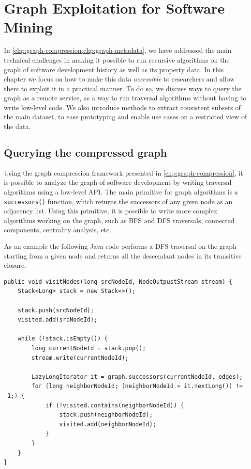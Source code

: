 \chapter{Graph Exploitation for Software Mining}%
\label{chp:graph-exploitation}

In \cref{chp:graph-compression,chp:graph-metadata}, we have addressed the main
technical challenges in making it possible to run recursive algorithms on the
graph of software development history as well as its property data. In this
chapter we focus on how to make this data \emph{accessible} to researchers and
allow them to exploit it in a practical manner. To do so, we discuss ways to
query the graph as a remote service, as a way to run traversal algorithms
without having to write low-level code. We also introduce methods to extract
consistent subsets of the main dataset, to ease prototyping and enable use
cases on a restricted view of the data.

\section{Querying the compressed graph}
\label{sec:graph-querying}

Using the graph compression framework presented in
\cref{chp:graph-compression}, it is possible to analyze the graph of software
development by writing traversal algorithms using a low-level API\@. The main
primitive for graph algorithms is a \texttt{successors()} function, which
returns the successors of any given node as an adjacency list. Using this
primitive, it is possible to write more complex algorithms working on the
graph, such as \gls{BFS} and \gls{DFS} traversals, connected components,
centrality analysis, etc.

As an example the following Java code performs a \gls{DFS} traversal on the
graph starting from a given node and returns all the descendant nodes in its
transitive closure.

\begin{verbatim}
public void visitNodes(long srcNodeId, NodeOutpustStream stream) {
    Stack<Long> stack = new Stack<>();

    stack.push(srcNodeId);
    visited.add(srcNodeId);

    while (!stack.isEmpty()) {
        long currentNodeId = stack.pop();
        stream.write(currentNodeId);

        LazyLongIterator it = graph.successors(currentNodeId, edges);
        for (long neighborNodeId; (neighborNodeId = it.nextLong()) != -1;) {
            if (!visited.contains(neighborNodeId)) {
                stack.push(neighborNodeId);
                visited.add(neighborNodeId);
            }
        }
    }
}
\end{verbatim}

